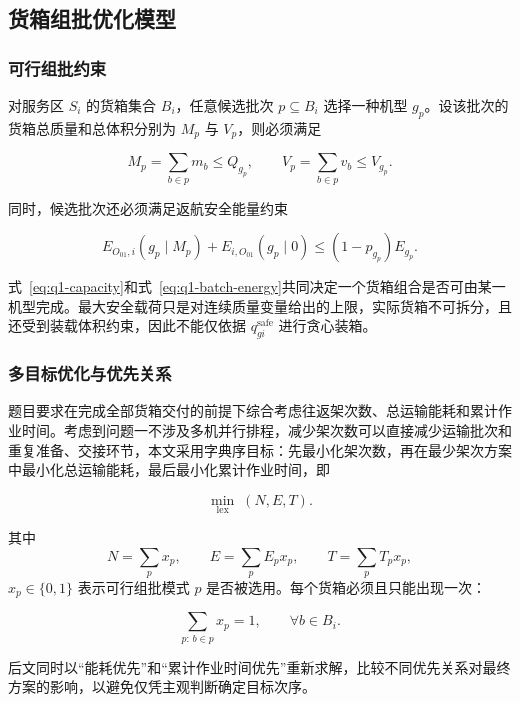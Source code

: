 \documentclass[bwprint,fontset=fandol]{gmcmthesis}
\begin{document}
\subsection{货箱组批优化模型}

\subsubsection{可行组批约束}
对服务区 $S_i$ 的货箱集合 $B_i$，任意候选批次 $p\subseteq B_i$ 选择一种机型 $g_p$。设该批次的货箱总质量和总体积分别为 $M_p$ 与 $V_p$，则必须满足

\begin{equation}
M_p=\sum_{b\in p}m_b\le Q_{g_p},\qquad
V_p=\sum_{b\in p}v_b\le V_{g_p}.
\label{eq:q1-capacity}
\end{equation}

同时，候选批次还必须满足返航安全能量约束

\begin{equation}
E_{O_{01},i}(g_p\mid M_p)
+E_{i,O_{01}}(g_p\mid0)
\le(1-p_{g_p})E_{g_p}.
\label{eq:q1-batch-energy}
\end{equation}

式~\eqref{eq:q1-capacity}和式~\eqref{eq:q1-batch-energy}共同决定一个货箱组合是否可由某一机型完成。最大安全载荷只是对连续质量变量给出的上限，实际货箱不可拆分，且还受到装载体积约束，因此不能仅依据 $q_{gi}^{\mathrm{safe}}$ 进行贪心装箱。

\subsubsection{多目标优化与优先关系}
题目要求在完成全部货箱交付的前提下综合考虑往返架次数、总运输能耗和累计作业时间。考虑到问题一不涉及多机并行排程，减少架次数可以直接减少运输批次和重复准备、交接环节，本文采用字典序目标：先最小化架次数，再在最少架次方案中最小化总运输能耗，最后最小化累计作业时间，即

\begin{equation}
\min_{\mathrm{lex}}\;(N,E,T).
\label{eq:q1-objective}
\end{equation}

其中
\[
N=\sum_p x_p,\qquad
E=\sum_p E_p x_p,\qquad
T=\sum_p T_p x_p,
\]
$x_p\in\{0,1\}$ 表示可行组批模式 $p$ 是否被选用。每个货箱必须且只能出现一次：

\begin{equation}
\sum_{p:\,b\in p}x_p=1,\qquad \forall b\in B_i.
\label{eq:q1-exact-cover}
\end{equation}

后文同时以“能耗优先”和“累计作业时间优先”重新求解，比较不同优先关系对最终方案的影响，以避免仅凭主观判断确定目标次序。
\end{document}

